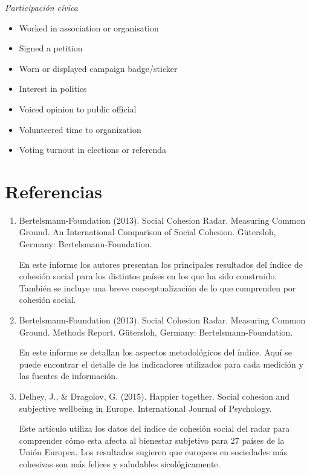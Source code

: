 \documentclass[
  12pt,
]{book}
\begin{document}
\emph{Participación cívica}

\begin{itemize}
\item
  Worked in association or organisation
\item
  Signed a petition
\item
  Worn or displayed campaign badge/sticker
\item
  Interest in politics
\item
  Voiced opinion to public official
\item
  Volunteered time to organization
\item
  Voting turnout in elections or referenda
\end{itemize}

\hypertarget{referencias-2}{%
\section{Referencias}\label{referencias-2}}

\begin{enumerate}
\def\labelenumi{\arabic{enumi}.}
\item
  Bertelsmann-Foundation (2013). Social Cohesion Radar. Measuring
  Common Ground. An International Comparison of Social Cohesion.
  Gütersloh, Germany: Bertelsmann-Foundation.

  En este informe los autores presentan los principales resultados del
  índice de cohesión social para los distintos países en los que ha
  sido construido. También se incluye una breve conceptualización de
  lo que comprenden por cohesión social.
\item
  Bertelsmann-Foundation (2013). Social Cohesion Radar. Measuring
  Common Ground. Methods Report. Gütersloh, Germany:
  Bertelsmann-Foundation.

  En este informe se detallan los aspectos metodológicos del índice.
  Aquí se puede encontrar el detalle de los indicadores utilizados
  para cada medición y las fuentes de información.
\item
  Delhey, J., \& Dragolov, G. (2015). Happier together. Social cohesion
  and subjective wellbeing in Europe. International Journal of
  Psychology.

  Este artículo utiliza los datos del índice de cohesión social del
  radar para comprender cómo esta afecta al bienestar subjetivo para
  27 países de la Unión Europea. Los resultados sugieren que europeos
  en sociedades más cohesivas son más felices y saludables
  sicológicamente.
\end{enumerate}
\end{document}
